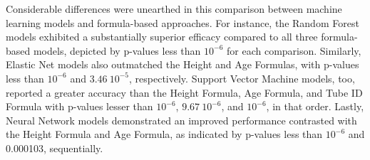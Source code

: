 \documentclass[11pt]{article}
\begin{document}
\begin{table}[h]
\caption{Comparison of p-values from the paired t-test of squared residuals of different machine-learning models and formula-based models}
\label{table:comparison_models_formulas}
\begin{threeparttable}
\renewcommand{\TPTminimum}{\linewidth}
\begin{tablenotes}
\footnotesize
\item 
\end{tablenotes}
\end{threeparttable}
\end{table}


Considerable differences were unearthed in this comparison between machine learning models and formula-based approaches. For instance, the Random Forest models exhibited a substantially superior efficacy compared to all three formula-based models, depicted by p-values less than $10^{-6}$ for each comparison. Similarly, Elastic Net models also outmatched the Height and Age Formulas, with p-values less than $10^{-6}$ and $3.46\ 10^{-5}$, respectively. Support Vector Machine models, too, reported a greater accuracy than the Height Formula, Age Formula, and Tube ID Formula with p-values lesser than $10^{-6}$, $9.67\ 10^{-6}$, and $10^{-6}$, in that order. Lastly, Neural Network models demonstrated an improved performance contrasted with the Height Formula and Age Formula, as indicated by p-values less than $10^{-6}$ and 0.000103, sequentially.
\end{document}
